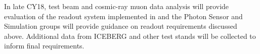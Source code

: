 In late CY18,  test beam and cosmic-ray muon data analysis will provide evaluation of the readout system implemented in  and the  Photon Sensor and Simulation groups will provide guidance on readout requirements discussed above. Additional data from ICEBERG and other test stands will be collected to inform final requirements. 




